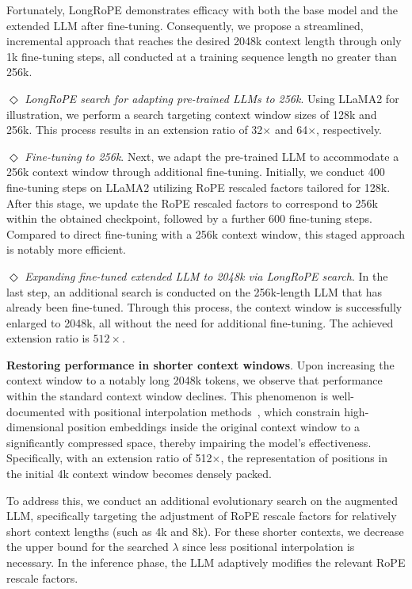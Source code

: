 Fortunately, LongRoPE demonstrates efficacy with both the base model and the extended LLM after fine-tuning. Consequently, we propose a streamlined, incremental approach that reaches the desired 2048k context length through only 1k fine-tuning steps, all conducted at a training sequence length no greater than 256k.

$\Diamond$ \textit{LongRoPE search for adapting pre-trained LLMs to 256k}. Using LLaMA2 for illustration, we perform a search targeting context window sizes of 128k and 256k. This process results in an extension ratio of 32$\times$ and 64$\times$, respectively.

$\Diamond$ \textit{Fine-tuning to 256k}. Next, we adapt the pre-trained LLM to accommodate a 256k context window through additional fine-tuning. Initially, we conduct 400 fine-tuning steps on LLaMA2 utilizing RoPE rescaled factors tailored for 128k. After this stage, we update the RoPE rescaled factors to correspond to 256k within the obtained checkpoint, followed by a further 600 fine-tuning steps. Compared to direct fine-tuning with a 256k context window, this staged approach is notably more efficient.

$\Diamond$ \textit{Expanding fine-tuned extended LLM to 2048k via LongRoPE search}. In the last step, an additional search is conducted on the 256k-length LLM that has already been fine-tuned. Through this process, the context window is successfully enlarged to 2048k, all without the need for additional fine-tuning. The achieved extension ratio is $512\times$.

\textbf{Restoring performance in shorter context windows}. Upon increasing the context window to a notably long 2048k tokens, we observe that performance within the standard context window declines. This phenomenon is well-documented with positional interpolation methods~\cite{pi}, which constrain high-dimensional position embeddings inside the original context window to a significantly compressed space, thereby impairing the model’s effectiveness. Specifically, with an extension ratio of 512$\times$, the representation of positions in the initial 4k context window becomes densely packed.

To address this, we conduct an additional evolutionary search on the augmented LLM, specifically targeting the adjustment of RoPE rescale factors for relatively short context lengths (such as 4k and 8k). For these shorter contexts, we decrease the upper bound for the searched $\lambda$ since less positional interpolation is necessary. In the inference phase, the LLM adaptively modifies the relevant RoPE rescale factors.

